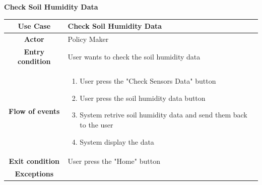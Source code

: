 \documentclass[table, 12pt]{article}
\begin{document}
\begin{itemize}
            
            \begin{table}[H]
                \item[] \textbf{Check Soil Humidity Data}
                \item[] 
                \centering
                \begin{tabular}{c m{}}
                    \hline
                    \textbf{Use Case} & Check Soil Humidity Data\\ \hline
                    \textbf{Actor} & Policy Maker \\ \hline
                    \textbf{Entry condition} & User wants to check the soil humidity data\\  \hline
                    \textbf{Flow of events} & \begin{enumerate}
                                                \item User press the "Check Sensors Data" button
                                                \item User press the soil humidity data button
                                                \item System retrive soil humidity data and send them back to the user
                                                \item System display the data
                                            \end{enumerate}\\ \hline
                    \textbf{Exit condition} & User press the "Home" button\\ \hline
                    \textbf{Exceptions} &  \\ \hline                   
                \end{tabular}
            \end{table}


\end{itemize}
\end{document}
